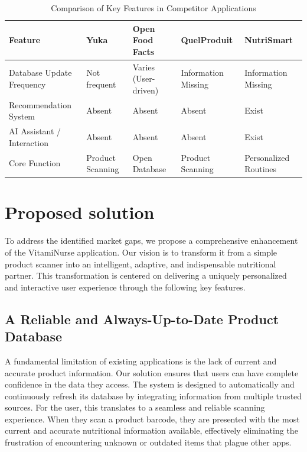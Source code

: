 \begin{table}[h!]
\centering
\caption{Comparison of Key Features in Competitor Applications}
\label{tab:app_comparison}
\begin{tabularx}{\textwidth}{|l|X|X|X|X|}
\hline
\textbf{Feature} & \textbf{Yuka} & \textbf{Open Food Facts} & \textbf{QuelProduit} & \textbf{NutriSmart} \\
\hline
Database Update Frequency & Not frequent & Varies (User-driven) & Information Missing & Information Missing \\
\hline
Recommendation System & Absent & Absent & Absent & Exist \\
\hline
AI Assistant / Interaction & Absent & Absent & Absent & Exist \\
\hline
Core Function & Product Scanning & Open Database & Product Scanning & Personalized Routines \\
\hline
\end{tabularx}
\end{table}
 
\section{Proposed solution}
  
To address the identified market gaps, we propose a comprehensive enhancement of the VitamiNurse application. Our vision is to transform it from a simple product scanner into an intelligent, adaptive, and indispensable nutritional partner. This transformation is centered on delivering a uniquely personalized and interactive user experience through the following key features.

\subsection{A Reliable and Always-Up-to-Date Product Database}

A fundamental limitation of existing applications is the lack of current and accurate product information. Our solution ensures that users can have complete confidence in the data they access. The system is designed to automatically and continuously refresh its database by integrating information from multiple trusted sources. For the user, this translates to a seamless and reliable scanning experience. When they scan a product barcode, they are presented with the most current and accurate nutritional information available, effectively eliminating the frustration of encountering unknown or outdated items that plague other apps.

